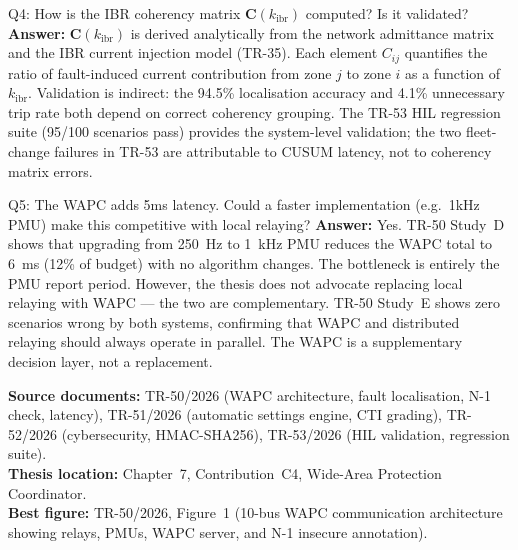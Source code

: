 \documentclass[12pt,a4paper]{article}
\newcommand{\kibr}{k_\mathrm{ibr}}
\begin{document}
\begin{keybox}{Q4: How is the IBR coherency matrix $\mathbf{C}(\kibr)$ computed? Is it validated?}
\textbf{Answer:} $\mathbf{C}(\kibr)$ is derived analytically from the network admittance matrix and the IBR current injection model (TR-35). Each element $C_{ij}$ quantifies the ratio of fault-induced current contribution from zone $j$ to zone $i$ as a function of $\kibr$. Validation is indirect: the 94.5\% localisation accuracy and 4.1\% unnecessary trip rate both depend on correct coherency grouping. The TR-53 HIL regression suite (95/100 scenarios pass) provides the system-level validation; the two fleet-change failures in TR-53 are attributable to CUSUM latency, not to coherency matrix errors.
\end{keybox}

\begin{keybox}{Q5: The WAPC adds 5ms latency. Could a faster implementation (e.g.\ 1kHz PMU) make this competitive with local relaying?}
\textbf{Answer:} Yes. TR-50 Study~D shows that upgrading from 250~Hz to 1~kHz PMU reduces the WAPC total to 6~ms (12\% of budget) with no algorithm changes. The bottleneck is entirely the PMU report period. However, the thesis does not advocate replacing local relaying with WAPC — the two are complementary. TR-50 Study~E shows zero scenarios wrong by both systems, confirming that WAPC and distributed relaying should always operate in parallel. The WAPC is a supplementary decision layer, not a replacement.
\end{keybox}

\vfill
\begin{tcolorbox}[colback=iitmnavy!8,colframe=iitmnavy,arc=3pt,boxrule=0.8pt]
\small
\textbf{Source documents:} TR-50/2026 (WAPC architecture, fault localisation, N-1 check, latency), TR-51/2026 (automatic settings engine, CTI grading), TR-52/2026 (cybersecurity, HMAC-SHA256), TR-53/2026 (HIL validation, regression suite). \\
\textbf{Thesis location:} Chapter~7, Contribution~C4, Wide-Area Protection Coordinator. \\
\textbf{Best figure:} TR-50/2026, Figure~1 (10-bus WAPC communication architecture showing relays, PMUs, WAPC server, and N-1 insecure annotation).
\end{tcolorbox}
\end{document}
